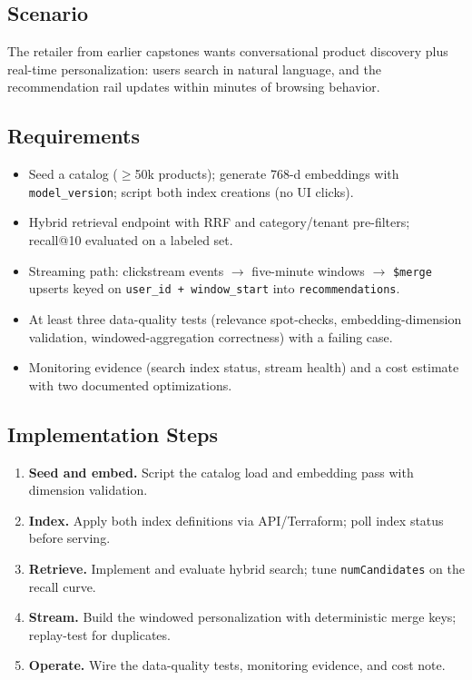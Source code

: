 \subsection*{Scenario}
The retailer from earlier capstones wants conversational product discovery plus real-time personalization: users search in natural language, and the recommendation rail updates within minutes of browsing behavior.

\subsection*{Requirements}
\begin{itemize}
    \item Seed a catalog (${\geq}$50k products); generate 768-d embeddings with \texttt{model\_version}; script both index creations (no UI clicks).
    \item Hybrid retrieval endpoint with RRF and category/tenant pre-filters; recall@10 evaluated on a labeled set.
    \item Streaming path: clickstream events $\to$ five-minute windows $\to$ \texttt{\$merge} upserts keyed on \texttt{user\_id + window\_start} into \texttt{recommendations}.
    \item At least three data-quality tests (relevance spot-checks, embedding-dimension validation, windowed-aggregation correctness) with a failing case.
    \item Monitoring evidence (search index status, stream health) and a cost estimate with two documented optimizations.
\end{itemize}

\subsection*{Implementation Steps}
\begin{enumerate}
    \item \textbf{Seed and embed.} Script the catalog load and embedding pass with dimension validation.
    \item \textbf{Index.} Apply both index definitions via API/Terraform; poll index status before serving.
    \item \textbf{Retrieve.} Implement and evaluate hybrid search; tune \texttt{numCandidates} on the recall curve.
    \item \textbf{Stream.} Build the windowed personalization with deterministic merge keys; replay-test for duplicates.
    \item \textbf{Operate.} Wire the data-quality tests, monitoring evidence, and cost note.
\end{enumerate}

